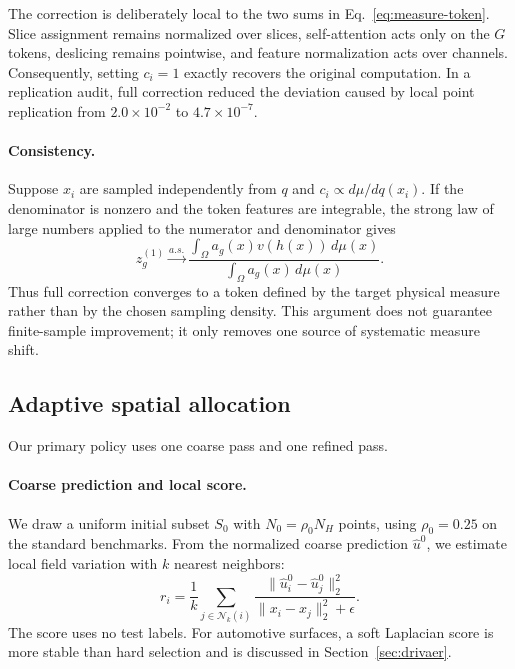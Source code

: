 \documentclass{article}
\begin{document}
The correction is deliberately local to the two sums in
Eq.~\eqref{eq:measure-token}. Slice assignment remains normalized over slices,
self-attention acts only on the $G$ tokens, deslicing remains pointwise, and
feature normalization acts over channels. Consequently, setting $c_i=1$ exactly
recovers the original computation. In a replication audit, full correction
reduced the deviation caused by local point replication from $2.0\times10^{-2}$
to $4.7\times10^{-7}$.

\paragraph{Consistency.}
Suppose $x_i$ are sampled independently from $q$ and
$c_i\propto d\mu/dq(x_i)$. If the denominator is nonzero and the token features
are integrable, the strong law of large numbers applied to the numerator and
denominator gives
\begin{equation}
z_g^{(1)} \xrightarrow[]{a.s.}
\frac{\int_\Omega a_g(x)v(h(x))\,d\mu(x)}
     {\int_\Omega a_g(x)\,d\mu(x)}.
\end{equation}
Thus full correction converges to a token defined by the target physical
measure rather than by the chosen sampling density. This argument does not
guarantee finite-sample improvement; it only removes one source of systematic
measure shift.

\subsection{Adaptive spatial allocation}

Our primary policy uses one coarse pass and one refined pass.

\paragraph{Coarse prediction and local score.}
We draw a uniform initial subset $S_0$ with $N_0=\rho_0N_H$ points, using
$\rho_0=0.25$ on the standard benchmarks. From the normalized coarse prediction
$\widehat u^0$, we estimate local field variation with $k$ nearest neighbors:
\begin{equation}
r_i = \frac{1}{k}\sum_{j\in\mathcal{N}_k(i)}
\frac{\|\widehat u_i^0-\widehat u_j^0\|_2^2}
     {\|x_i-x_j\|_2^2+\epsilon}.
\label{eq:grad-score}
\end{equation}
The score uses no test labels. For automotive surfaces, a soft Laplacian score
is more stable than hard selection and is discussed in
Section~\ref{sec:drivaer}.
\end{document}
